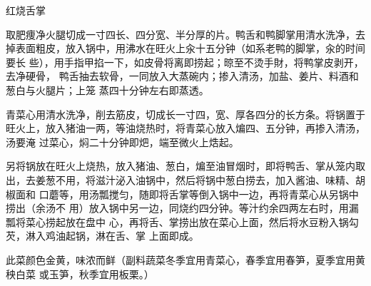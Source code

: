 \begin{recipe}{红烧舌掌}

\ingredients


\preparation

\step 取肥痩净火腿切成一寸四长、四分宽、半分厚的片。鸭舌和鸭脚掌用清水洗净，去
掉表面粗皮，放入锅中，用沸水在旺火上汆十五分钟（如系老鸭的脚掌，汆的时间要长
些），用手指甲掐一下，如皮骨将离即捞起；晾至不烫手財，将鸭掌皮剥开，去净硬骨，
鸭舌抽去软骨，一同放入大蒸碗内；掺入清汤，加盐、姜片、料酒和葱白与火腿片；上笼
蒸四十分钟左右即蒸透。

\step 青菜心用清水洗净，削去筋皮，切成长一寸四，宽、厚各四分的长方条。将锅置于
旺火上，放入猪油一两，等油烧热时，将青菜心放入煸四、五分钟，再掺入清汤，汤要淹
过菜心，焖二十分钟即𤆵，端至微火上焅起。

\step 另将锅放在旺火上烧热，放入猪油、葱白，煸至油冒烟时，即将鸭舌、掌从笼内取
出，去姜葱不用，将滋汁泌入油锅中，然后将锅中葱白捞去，加入酱油、味精、胡椒面和
口蘑等，用汤瓢搅匀，随即将舌掌等倒入锅中一边，再将青菜心从另锅中捞出（余汤不
用）放入锅中另一边，同烧约四分钟。等汁约余四两左右时，用漏瓢将菜心捞起放在盘中
心，再将舌、掌捞出放在菜心上面，然后将水豆粉入锅勾芡，淋入鸡油起锅，淋在舌、掌
上面即成。

\features

此菜颜色金黄，味浓而鲜（副料蔬菜冬季宜用青菜心，春季宜用春笋，夏季宜用黄秧白菜
或玉笋，秋季宜用板栗。）

\end{recipe}

